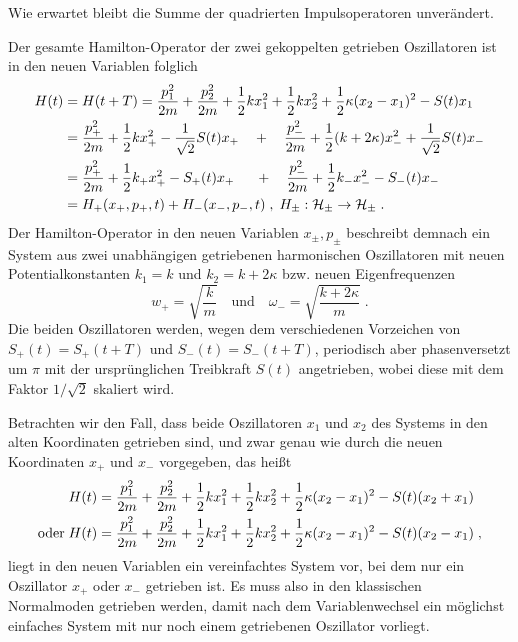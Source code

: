   Wie erwartet bleibt die Summe der quadrierten Impulsoperatoren unverändert.

  Der gesamte Hamilton-Operator der zwei gekoppelten getrieben Oszillatoren ist in den neuen Variablen folglich
  \begin{align}
    H(t) &= H(t+T) = \frac{p_1^2}{2m} + \frac{p_2^2}{2m} + \frac 1 2 kx_1^2 + \frac 1 2 kx_2^2 + \frac 1 2 \kappa(x_2-x_1)^2 - S(t)x_1 \notag\\
    &= \frac{p_+^2}{2m}+\frac{1}{2}kx_+^2-\frac{1}{\sqrt{2}}S(t)x_+ \quad + \quad
    \frac{p_-^2}{2m}+\frac{1}{2}(k+2\kappa)x_-^2+\frac{1}{\sqrt{2}}S(t)x_- \notag\\
    &= \frac{p_+^2}{2m}+\frac{1}{2}k_+x_+^2-S_+(t)x_+ \quad \;\: + \quad
    \frac{p_-^2}{2m}+\frac{1}{2}k_-x_-^2-S_-(t)x_- \notag\\
    &= H_+(x_+,p_+,t) + H_-(x_-,p_-,t) \;,\; H_\pm:\cal H_\pm \rightarrow \cal H_\pm \; .
    \label{gekoppelte_H_entkoppelt}
  \end{align}
  Der Hamilton-Operator in den neuen Variablen $x_{\pm},p_{\pm}$ beschreibt demnach ein System aus zwei unabhängigen getriebenen harmonischen Oszillatoren mit neuen Potentialkonstanten $k_1=k$ und $k_2=k+2\kappa$ bzw. neuen Eigenfrequenzen
  \begin{equation}
    w_+=\sqrt{\frac{k}{m}} \quad\text{und}\quad \omega_-=\sqrt{\frac{k+2\kappa}{m}} \; .
    \label{neue_eigenfrequenzen}
  \end{equation}
  Die beiden Oszillatoren werden, wegen dem verschiedenen Vorzeichen von $S_+(t)=S_+(t+T)$ und $S_-(t)=S_-(t+T)$, periodisch aber phasenversetzt um $\pi$ mit der ursprünglichen Treibkraft $S(t)$ angetrieben, wobei diese mit dem Faktor $1/\sqrt{2}$ skaliert wird.

Betrachten wir den Fall, dass beide Oszillatoren $x_1$ und $x_2$ des Systems in den alten Koordinaten getrieben sind, und zwar genau wie durch die neuen Koordinaten $x_+$ und $x_-$ vorgegeben, das heißt
  \begin{align}
      &H(t) = \frac{p_1^2}{2m} + \frac{p_2^2}{2m} + \frac 1 2 kx_1^2 + \frac 1 2 kx_2^2 + \frac 1 2 \kappa(x_2-x_1)^2 - S(t)(x_2+x_1) \notag\\
      \text{oder} \; &H(t) = \frac{p_1^2}{2m} + \frac{p_2^2}{2m} + \frac 1 2 kx_1^2 + \frac 1 2 kx_2^2 + \frac 1 2 \kappa(x_2-x_1)^2 - S(t)(x_2-x_1) \;,
  \end{align}
  liegt in den neuen Variablen ein vereinfachtes System vor, bei dem nur ein Oszillator $x_+$ oder $x_-$ getrieben ist.
  Es muss also in den klassischen Normalmoden getrieben werden, damit nach dem Variablenwechsel ein möglichst einfaches System mit nur noch einem getriebenen Oszillator vorliegt.

